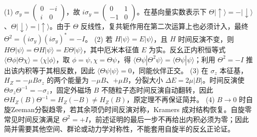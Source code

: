 (1) \(\sigma_y=\begin{pmatrix}0&-i\\i&0\end{pmatrix}\)，故 \(i\sigma_y=\begin{pmatrix}0&1\\-1&0\end{pmatrix}\)。在基向量实数表示下 \(\Theta|\uparrow\rangle=-|\downarrow\rangle\)、\(\Theta|\downarrow\rangle=|\uparrow\rangle\)。由于 \(\Theta\) 反线性，复共轭作用在第二次运算上也必须计入，最终 \(\Theta^2=(i\sigma_y)(i\sigma_y)^*=-I\)。
(2) 若 \(H|\psi\rangle=E|\psi\rangle\)，且 \(H\) 时间反演不变，则 \(H\Theta|\psi\rangle=\Theta H|\psi\rangle=E\Theta|\psi\rangle\)，其中厄米本征值 \(E\) 为实。反幺正内积恒等式 \(\langle\Theta\phi|\Theta\chi\rangle=\langle\chi|\phi\rangle\)，取 \(\phi=\psi,\chi=\Theta\psi\)，得 \(\langle\Theta\psi|\Theta^2\psi\rangle=\langle\Theta\psi|\psi\rangle\)；利用 \(\Theta^2=-I\) 推出该内积等于其相反数，因此 \(\langle\Theta\psi|\psi\rangle=0\)，同能伙伴正交。
(3) 在 \(\sigma_z\) 本征基，\(H_Z=-\mu B\sigma_z\) 的两个能量为 \(-\mu B\)、\(+\mu B\)，分裂大小 \(\Delta E=2\mu|B|\)。时间反演使 \(\Theta\sigma_z\Theta^{-1}=-\sigma_z\)，固定外磁场 \(B\) 不随粒子态时间反演自动翻转，因此 \(\Theta H_Z(B)\Theta^{-1}=H_Z(-B)\ne H_Z(B)\)，原定理不再保证简并。
(4) \(B\to0\) 时自旋Zeeman分裂趋零，若其余项仍时间反演对称，Kramers 成对结构恢复。自旋零常见时间反演满足 \(\Theta^2=+I\)，前述证明的最后一步不再给出内积必须为零；因此简并需要其他空间、群论或动力学对称性，不能套用自旋半的反幺正论证。
